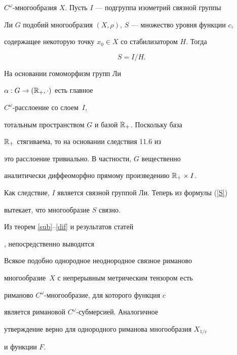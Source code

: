 \begin{pf}
$C^{\omega}$-многообразия $X$. Пусть $I$ --- подгруппа изометрий связной группы


Ли $G$ подобий многообразия $(X,\rho)$, $S$ --- множество уровня функции $c$,


содержащее некоторую точку $x_{0} \in X$ со стабилизатором $H$. Тогда


\begin{equation}


\label{S}


S=I/H.


\end{equation}


На основании \cite{St} гомоморфизм групп Ли


$\alpha: G \rightarrow (\Bbb{R}_{+},\cdot)$ есть главное


$C^{\omega}$-расслоение со слоем~$I$,


тотальным пространством $G$ и базой $\Bbb{R}_{+}$. Поскольку база


$\Bbb{R}_{+}$ стягиваема, то на основании следствия 11.6 из \cite{St}


это расслоение тривиально. В частности, $G$ вещественно


аналитически диффеоморфно прямому произведению $\Bbb{R}_{+} \times I$.


Как следствие, $I$ является связной группой Ли. Теперь из формулы (\ref{S})


вытекает, что многообразие $S$ связно.


\end{pf}





Из теорем \ref{sub}--\ref{dif} и результатов статей


\cite{B}, \cite{BG} непосредственно выводится





\begin{cors}


\label{rim}


Всякое подобно однородное неоднородное связное риманово


многообразие~$X$ с непрерывным метрическим тензором есть


риманово $C^{\omega}$-многообразие, для которого функция $c$


является римановой $C^{\omega}$-субмерсией. Аналогичное


утверждение верно для однородного риманова многообразия $X_{1/c}$


и функции $F$.


\end{cors}





